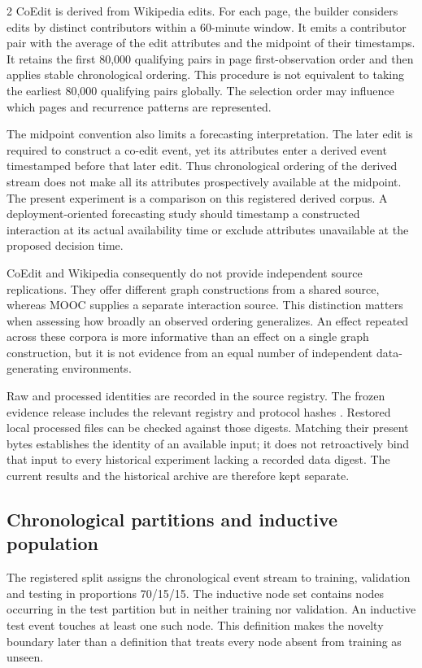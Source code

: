 \documentclass[a4paper,10pt]{article}
\begin{document}
\begin{multicols}{2}
CoEdit is derived from Wikipedia edits. For each page, the builder considers edits by distinct contributors within a 60-minute window. It emits a contributor pair with the average of the edit attributes and the midpoint of their timestamps. It retains the first 80,000 qualifying pairs in page first-observation order and then applies stable chronological ordering. This procedure is not equivalent to taking the earliest 80,000 qualifying pairs globally. The selection order may influence which pages and recurrence patterns are represented.

The midpoint convention also limits a forecasting interpretation. The later edit is required to construct a co-edit event, yet its attributes enter a derived event timestamped before that later edit. Thus chronological ordering of the derived stream does not make all its attributes prospectively available at the midpoint. The present experiment is a comparison on this registered derived corpus. A deployment-oriented forecasting study should timestamp a constructed interaction at its actual availability time or exclude attributes unavailable at the proposed decision time.

CoEdit and Wikipedia consequently do not provide independent source replications. They offer different graph constructions from a shared source, whereas MOOC supplies a separate interaction source. This distinction matters when assessing how broadly an observed ordering generalizes. An effect repeated across these corpora is more informative than an effect on a single graph construction, but it is not evidence from an equal number of independent data-generating environments.

Raw and processed identities are recorded in the source registry. The frozen evidence release includes the relevant registry and protocol hashes \cite{repo}. Restored local processed files can be checked against those digests. Matching their present bytes establishes the identity of an available input; it does not retroactively bind that input to every historical experiment lacking a recorded data digest. The current results and the historical archive are therefore kept separate.

\subsection{Chronological partitions and inductive population}
The registered split assigns the chronological event stream to training, validation and testing in proportions 70/15/15. The inductive node set contains nodes occurring in the test partition but in neither training nor validation. An inductive test event touches at least one such node. This definition makes the novelty boundary later than a definition that treats every node absent from training as unseen.


\end{multicols}
\end{document}
